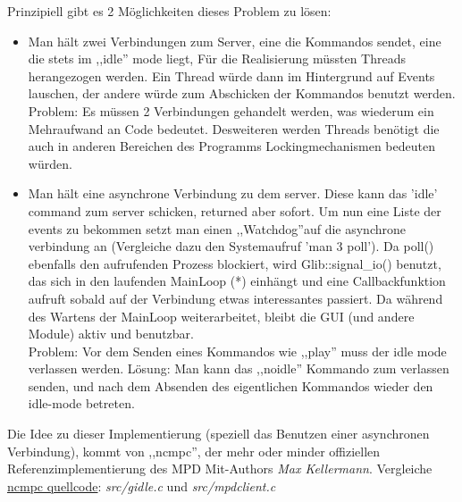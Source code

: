 Prinzipiell gibt es 2 Möglichkeiten dieses Problem zu lösen:
\begin{itemize}
    \item Man hält zwei Verbindungen zum Server, eine die Kommandos sendet, eine die stets im ,,idle'' mode liegt,
        Für die Realisierung müssten Threads herangezogen werden. Ein Thread würde dann im Hintergrund auf Events lauschen,
        der andere würde zum Abschicken der Kommandos benutzt werden.
        Problem: Es müssen 2 Verbindungen gehandelt werden, was wiederum ein Mehraufwand an Code bedeutet.
        Desweiteren werden Threads benötigt die auch in anderen Bereichen des Programms Lockingmechanismen bedeuten würden.
    \item Man hält eine asynchrone Verbindung zu dem server.
        Diese kann das 'idle' command zum server schicken, returned aber sofort. Um nun eine Liste der events zu bekommen setzt man 
        einen ,,Watchdog''auf die asynchrone verbindung an (Vergleiche dazu den Systemaufruf 'man 3 poll'). Da poll() ebenfalls den
        aufrufenden Prozess blockiert, wird Glib::signal\_io() benutzt, das sich in den laufenden MainLoop (*) einhängt und eine 
        Callbackfunktion aufruft sobald auf der Verbindung etwas interessantes passiert. Da während des Wartens der MainLoop weiterarbeitet,
        bleibt die GUI (und andere Module) aktiv und benutzbar.
        \\
        Problem: Vor dem Senden eines Kommandos wie ,,play'' muss der idle mode verlassen werden.
        Lösung: Man kann das ,,noidle'' Kommando zum verlassen senden, und nach dem Absenden des eigentlichen Kommandos wieder den idle-mode betreten.
\end{itemize}



Die Idee zu dieser Implementierung (speziell das Benutzen einer asynchronen Verbindung), kommt von ,,ncmpc'',
der mehr oder minder offiziellen Referenzimplementierung des MPD Mit-Authors \emph{Max Kellermann}.
Vergleiche \href{http://mpd.wikia.com/wiki/Client:Ncmpc}{ncmpc quellcode}: \textit{src/gidle.c} und \textit{src/mpdclient.c}

